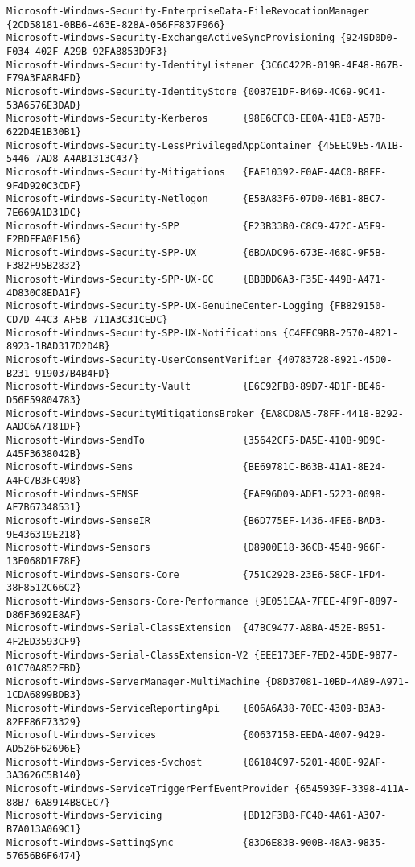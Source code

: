 \documentclass{report}
\begin{document}
\begin{lstlisting}[breaklines=true,basicstyle=\tiny]
Microsoft-Windows-Security-EnterpriseData-FileRevocationManager {2CD58181-0BB6-463E-828A-056FF837F966}
Microsoft-Windows-Security-ExchangeActiveSyncProvisioning {9249D0D0-F034-402F-A29B-92FA8853D9F3}
Microsoft-Windows-Security-IdentityListener {3C6C422B-019B-4F48-B67B-F79A3FA8B4ED}
Microsoft-Windows-Security-IdentityStore {00B7E1DF-B469-4C69-9C41-53A6576E3DAD}
Microsoft-Windows-Security-Kerberos      {98E6CFCB-EE0A-41E0-A57B-622D4E1B30B1}
Microsoft-Windows-Security-LessPrivilegedAppContainer {45EEC9E5-4A1B-5446-7AD8-A4AB1313C437}
Microsoft-Windows-Security-Mitigations   {FAE10392-F0AF-4AC0-B8FF-9F4D920C3CDF}
Microsoft-Windows-Security-Netlogon      {E5BA83F6-07D0-46B1-8BC7-7E669A1D31DC}
Microsoft-Windows-Security-SPP           {E23B33B0-C8C9-472C-A5F9-F2BDFEA0F156}
Microsoft-Windows-Security-SPP-UX        {6BDADC96-673E-468C-9F5B-F382F95B2832}
Microsoft-Windows-Security-SPP-UX-GC     {BBBDD6A3-F35E-449B-A471-4D830C8EDA1F}
Microsoft-Windows-Security-SPP-UX-GenuineCenter-Logging {FB829150-CD7D-44C3-AF5B-711A3C31CEDC}
Microsoft-Windows-Security-SPP-UX-Notifications {C4EFC9BB-2570-4821-8923-1BAD317D2D4B}
Microsoft-Windows-Security-UserConsentVerifier {40783728-8921-45D0-B231-919037B4B4FD}
Microsoft-Windows-Security-Vault         {E6C92FB8-89D7-4D1F-BE46-D56E59804783}
Microsoft-Windows-SecurityMitigationsBroker {EA8CD8A5-78FF-4418-B292-AADC6A7181DF}
Microsoft-Windows-SendTo                 {35642CF5-DA5E-410B-9D9C-A45F3638042B}
Microsoft-Windows-Sens                   {BE69781C-B63B-41A1-8E24-A4FC7B3FC498}
Microsoft-Windows-SENSE                  {FAE96D09-ADE1-5223-0098-AF7B67348531}
Microsoft-Windows-SenseIR                {B6D775EF-1436-4FE6-BAD3-9E436319E218}
Microsoft-Windows-Sensors                {D8900E18-36CB-4548-966F-13F068D1F78E}
Microsoft-Windows-Sensors-Core           {751C292B-23E6-58CF-1FD4-38F8512C66C2}
Microsoft-Windows-Sensors-Core-Performance {9E051EAA-7FEE-4F9F-8897-D86F3692E8AF}
Microsoft-Windows-Serial-ClassExtension  {47BC9477-A8BA-452E-B951-4F2ED3593CF9}
Microsoft-Windows-Serial-ClassExtension-V2 {EEE173EF-7ED2-45DE-9877-01C70A852FBD}
Microsoft-Windows-ServerManager-MultiMachine {D8D37081-10BD-4A89-A971-1CDA6899BDB3}
Microsoft-Windows-ServiceReportingApi    {606A6A38-70EC-4309-B3A3-82FF86F73329}
Microsoft-Windows-Services               {0063715B-EEDA-4007-9429-AD526F62696E}
Microsoft-Windows-Services-Svchost       {06184C97-5201-480E-92AF-3A3626C5B140}
Microsoft-Windows-ServiceTriggerPerfEventProvider {6545939F-3398-411A-88B7-6A8914B8CEC7}
Microsoft-Windows-Servicing              {BD12F3B8-FC40-4A61-A307-B7A013A069C1}
Microsoft-Windows-SettingSync            {83D6E83B-900B-48A3-9835-57656B6F6474}

\end{lstlisting}
\end{document}
